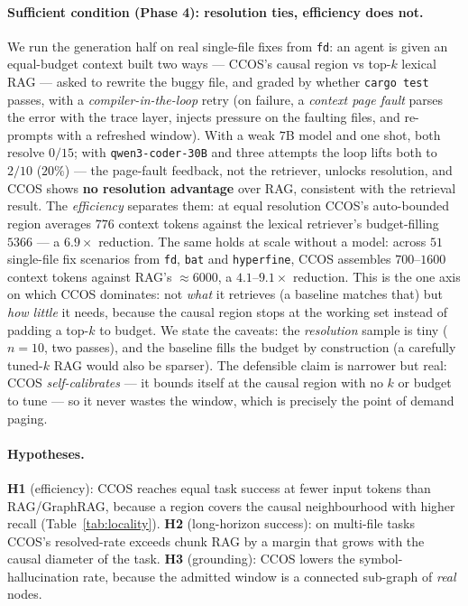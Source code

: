 \documentclass[11pt]{article}
\newcommand{\code}[1]{\texttt{#1}}
\begin{document}
\paragraph{Sufficient condition (Phase 4): resolution ties, efficiency does not.}
We run the generation half on real single-file fixes from \code{fd}: an agent is
given an equal-budget context built two ways --- CCOS's causal region vs top-$k$
lexical RAG --- asked to rewrite the buggy file, and graded by whether
\code{cargo test} passes, with a \emph{compiler-in-the-loop} retry (on failure, a
\emph{context page fault} parses the error with the trace layer, injects pressure on
the faulting files, and re-prompts with a refreshed window). With a weak $7$B model
and one shot, both resolve $0/15$; with \code{qwen3-coder-30B} and three attempts
the loop lifts both to $2/10$ ($20\%$) --- the page-fault feedback, not the
retriever, unlocks resolution, and CCOS shows \textbf{no resolution advantage} over
RAG, consistent with the retrieval result. The \emph{efficiency} separates them: at
equal resolution CCOS's auto-bounded region averages $776$ context tokens against
the lexical retriever's budget-filling $5366$ --- a $\mathbf{6.9\times}$ reduction.
The same holds at scale without a model: across $51$ single-file fix scenarios from
\code{fd}, \code{bat} and \code{hyperfine}, CCOS assembles $700$--$1600$ context
tokens against RAG's $\approx\!6000$, a $\mathbf{4.1}$--$\mathbf{9.1\times}$
reduction. This is the one axis on which CCOS dominates: not \emph{what} it
retrieves (a baseline matches that) but \emph{how little} it needs, because the
causal region stops at the working set instead of padding a top-$k$ to budget. We
state the caveats: the \emph{resolution} sample is tiny ($n{=}10$, two passes), and
the baseline fills the budget by construction (a carefully tuned-$k$ RAG would also
be sparser). The defensible claim is narrower but real: CCOS \emph{self-calibrates}
--- it bounds itself at the causal region with no $k$ or budget to tune --- so it
never wastes the window, which is precisely the point of demand paging.

\paragraph{Hypotheses.}
\textbf{H1} (efficiency): CCOS reaches equal task success at fewer input tokens
than RAG/GraphRAG, because a region covers the causal neighbourhood with higher
recall (Table~\ref{tab:locality}).
\textbf{H2} (long-horizon success): on multi-file tasks CCOS's resolved-rate
exceeds chunk RAG by a margin that grows with the causal diameter of the task.
\textbf{H3} (grounding): CCOS lowers the symbol-hallucination rate, because the
admitted window is a connected sub-graph of \emph{real} nodes.
\end{document}
